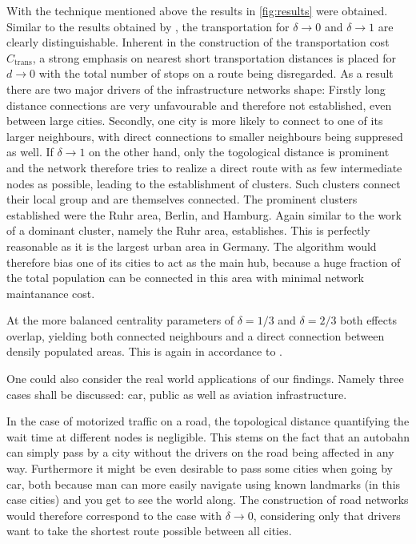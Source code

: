 \documentclass[aps,pra,showpacs,preprintnumbers,amsmath,amssymb,footinbib]{revtex4-2}
\begin{document}
    With the technique mentioned above the results in \cref{fig:results} were obtained.
    Similar to the results obtained by \citeauthor{PhysRevE.74.016117}, the transportation for $\delta \rightarrow 0$ and $\delta \rightarrow 1$ are clearly distinguishable.
    Inherent in the construction of the transportation cost $C_{\mathrm{trans}}$, a strong emphasis on nearest short transportation distances is placed for $d \rightarrow 0$ with the total number of stops on a route being disregarded.
    As a result there are two major drivers of the infrastructure networks shape: Firstly long distance connections are very unfavourable and therefore not established, even between large cities. 
    Secondly, one city is more likely to connect to one of its larger neighbours, with direct connections to smaller neighbours being suppresed as well.
    If $\delta \rightarrow 1$ on the other hand, only the togological distance is prominent and the network therefore tries to realize a direct route with as few intermediate nodes as possible, leading to the establishment of clusters.
    Such clusters connect their local group and are themselves connected.
    The prominent clusters established were the Ruhr area, Berlin, and Hamburg.
    Again similar to the work of \citeauthor{PhysRevE.74.016117} a dominant cluster, namely the Ruhr area, establishes.
    This is perfectly reasonable as it is the largest urban area in Germany.
    The algorithm would therefore bias one of its cities to act as the main hub, because a huge fraction of the total population can be connected in this area with minimal network maintanance cost.


    At the more balanced centrality parameters of $\delta = 1/3$ and $\delta = 2/3$ both effects overlap, yielding both connected neighbours and a direct connection between densily populated areas.
    This is again in accordance to \citeauthor{PhysRevE.74.016117}.
    
    One could also consider the real world applications of our findings.
    Namely three cases shall be discussed: car, public as well as aviation infrastructure.
    
    In the case of motorized traffic on a road, the topological distance quantifying the wait time at different nodes is negligible.
    This stems on the fact that an autobahn can simply pass by a city without the drivers on the road being affected in any way.
    Furthermore it might be even desirable to pass some cities when going by car, both because man can more easily navigate using known landmarks (in this case cities) and you get to see the world along.
    The construction of road networks would therefore correspond to the case with $\delta \rightarrow 0$, considering only that drivers want to take the shortest route possible between all cities.
\end{document}
